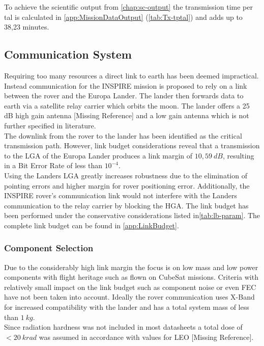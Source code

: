 To achieve the scientific output from \autoref{chap:sc-output} the transmission time per tal is calculated in \autoref{app:MissionDataOutput} (\autoref{tab:Tx-tptal}) and adds up to 38,23 minutes. 
	
\subsection{Communication System}
Requiring too many resources a direct link to earth has been deemed impractical. Instead communication for the INSPIRE mission is proposed to rely on a link between the rover and the Europa Lander. The lander then forwards data to earth via a satellite relay carrier which orbits the moon. The lander offers a 25 dB high gain antenna [Missing Reference] and a low gain antenna which is not further specified in literature.\\

The downlink from the rover to the lander has been identified as the critical transmission path. However, link budget considerations reveal that a transmission to the LGA of the Europa Lander produces a link margin of $10,59\ dB$, resulting in a Bit Error Rate of less than $10^{-4}$.\\

Using the Landers LGA greatly increases robustness due to the elimination of pointing errors and higher margin for rover positioning error. Additionally, the INSPIRE rover’s communication link would not interfere with the Landers communication to the relay carrier by blocking the HGA. The link budget has been performed under the conservative considerations listed in\autoref{tab:lb-param}. The complete link budget can be found in \autoref{app:LinkBudget}. 

\subsubsection{Component Selection}

Due to the considerably high link margin the focus is on low mass and low power components with flight heritage such as flown on CubeSat missions. Criteria with relatively small impact on the link budget such as component noise or even FEC have not been taken into account. Ideally the rover communication uses X-Band for increased compatibility with the lander and has a total system mass of less than $1\ kg$. \\
Since radiation hardness was not included in most datasheets a total dose of $<20\ krad$ was assumed in accordance with values for LEO [Missing Reference].


